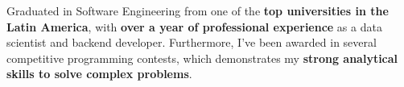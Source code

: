 \documentclass[a4paper,12pt]{article}
\begin{document}

Graduated in Software Engineering from one of the \textbf{top universities in the Latin America},
with  \textbf{over a year of professional experience} as a data scientist and backend 
developer. Furthermore, I've been awarded in several competitive programming
contests, which demonstrates my \textbf{strong analytical skills to solve complex problems}.
\end{document}
